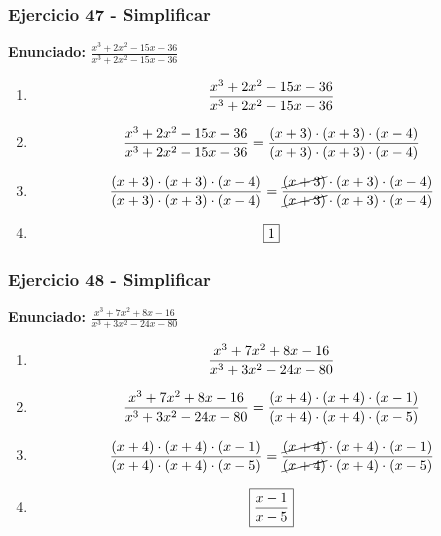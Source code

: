 \documentclass[11pt,a4paper]{article}
\newcommand{\fitmath}[1]{%
\[
\setbox0=\hbox{$\displaystyle #1$}%
\ifdim\wd0>\linewidth
\resizebox{\linewidth}{!}{$\displaystyle #1$}%
\else
#1%
\fi
\]
}
\begin{document}
\vspace{0.12cm}
\subsubsection*{Ejercicio 47 - Simplificar}
\textbf{Enunciado:} $ \frac{x^{3} + 2 x^{2} - 15 x - 36}{x^{3} + 2 x^{2} - 15 x - 36} $\par
\begin{enumerate}[leftmargin=2em]
\item \fitmath{\frac{x^{3} + 2 x^{2} - 15 x - 36}{x^{3} + 2 x^{2} - 15 x - 36}}
\item \fitmath{\frac{x^{3} + 2 x^{2} - 15 x - 36}{x^{3} + 2 x^{2} - 15 x - 36}=\frac{\left(x + 3\right)\cdot \left(x + 3\right)\cdot \left(x - 4\right)}{\left(x + 3\right)\cdot \left(x + 3\right)\cdot \left(x - 4\right)}}
\item \fitmath{\frac{\left(x + 3\right)\cdot \left(x + 3\right)\cdot \left(x - 4\right)}{\left(x + 3\right)\cdot \left(x + 3\right)\cdot \left(x - 4\right)}=\frac{\cancel{\left(x + 3\right)}\cdot \left(x + 3\right)\cdot \left(x - 4\right)}{\cancel{\left(x + 3\right)}\cdot \left(x + 3\right)\cdot \left(x - 4\right)}}
\item \fitmath{\boxed{1}}
\end{enumerate}

\vspace{0.12cm}
\subsubsection*{Ejercicio 48 - Simplificar}
\textbf{Enunciado:} $ \frac{x^{3} + 7 x^{2} + 8 x - 16}{x^{3} + 3 x^{2} - 24 x - 80} $\par
\begin{enumerate}[leftmargin=2em]
\item \fitmath{\frac{x^{3} + 7 x^{2} + 8 x - 16}{x^{3} + 3 x^{2} - 24 x - 80}}
\item \fitmath{\frac{x^{3} + 7 x^{2} + 8 x - 16}{x^{3} + 3 x^{2} - 24 x - 80}=\frac{\left(x + 4\right)\cdot \left(x + 4\right)\cdot \left(x - 1\right)}{\left(x + 4\right)\cdot \left(x + 4\right)\cdot \left(x - 5\right)}}
\item \fitmath{\frac{\left(x + 4\right)\cdot \left(x + 4\right)\cdot \left(x - 1\right)}{\left(x + 4\right)\cdot \left(x + 4\right)\cdot \left(x - 5\right)}=\frac{\cancel{\left(x + 4\right)}\cdot \left(x + 4\right)\cdot \left(x - 1\right)}{\cancel{\left(x + 4\right)}\cdot \left(x + 4\right)\cdot \left(x - 5\right)}}
\item \fitmath{\boxed{\frac{x - 1}{x - 5}}}
\end{enumerate}
\end{document}
